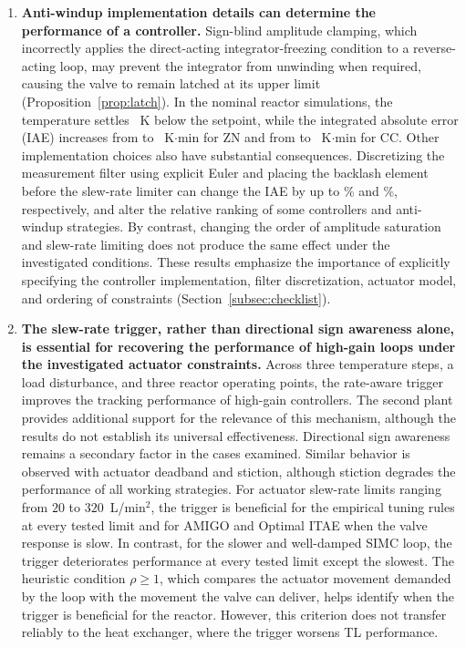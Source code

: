 \begin{enumerate}

\item \textbf{Anti-windup implementation details can determine the performance of a controller.}
Sign-blind amplitude clamping, which incorrectly applies the direct-acting integrator-freezing condition to a reverse-acting loop, may prevent the integrator from unwinding when required, causing the valve to remain latched at its upper limit (Proposition~\ref{prop:latch}). In the nominal reactor simulations, the temperature settles \vlatchgap{}~K below the setpoint, while the integrated absolute error (IAE) increases from \vZNdir{} to \vZNsign{}~K$\cdot$min for ZN and from \vCCdir{} to \vCCsign{}~K$\cdot$min for CC. Other implementation choices also have substantial consequences. Discretizing the measurement filter using explicit Euler and placing the backlash element before the slew-rate limiter can change the IAE by up to \vorderFourdIAE{}\% and \vorderTwodIAE{}\%, respectively, and alter the relative ranking of some controllers and anti-windup strategies. By contrast, changing the order of amplitude saturation and slew-rate limiting does not produce the same effect under the investigated conditions. These results emphasize the importance of explicitly specifying the controller implementation, filter discretization, actuator model, and ordering of constraints (Section~\ref{subsec:checklist}).

\item \textbf{The slew-rate trigger, rather than directional sign awareness alone, is essential for recovering the performance of high-gain loops under the investigated actuator constraints.}
Across three temperature steps, a load disturbance, and three reactor operating points, the rate-aware trigger improves the tracking performance of high-gain controllers. The second plant provides additional support for the relevance of this mechanism, although the results do not establish its universal effectiveness. Directional sign awareness remains a secondary factor in the cases examined. Similar behavior is observed with actuator deadband and stiction, although stiction degrades the performance of all working strategies. For actuator slew-rate limits ranging from $20$ to $320$~L/min$^2$, the trigger is beneficial for the empirical tuning rules at every tested limit and for AMIGO and Optimal ITAE when the valve response is slow. In contrast, for the slower and well-damped SIMC loop, the trigger deteriorates performance at every tested limit except the slowest. The heuristic condition $\rho \geq 1$, which compares the actuator movement demanded by the loop with the movement the valve can deliver, helps identify when the trigger is beneficial for the reactor. However, this criterion does not transfer reliably to the heat exchanger, where the trigger worsens TL performance.


\end{enumerate}
